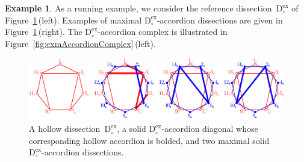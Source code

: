 \documentclass{amsart}
\theoremstyle{definition}
\newtheorem{example}[theorem]{Example}
\newcommand{\fref}[1]{Figure~\ref{#1}} %
\newcommand{\dissection}{\mathrm{D}} %
\newcommand{\ex}{\mathrm{ex}} %
\begin{document}
\begin{example}
As a running example, we consider the reference dissection~$\dissection_\circ^\ex$ of \fref{fig:exmAccordionDissections}\,(left). Examples of maximal $\dissection_\circ^\ex$-accordion dissections are given in \fref{fig:exmAccordionDissections}\,(right). The $\dissection_\circ^\ex$-accordion complex is illustrated in \fref{fig:exmAccordionComplex}\,(left).

\begin{figure}
	\capstart
	\centerline{\includegraphics[scale=.8]{exmAccordionDissections}}
	\vspace*{-.1cm}
	\caption{A hollow dissection~$\dissection_\circ^\ex$, a solid $\dissection_\circ^\ex$-accordion diagonal whose corresponding hollow accordion is bolded, and two maximal solid $\dissection_\circ^\ex$-accordion dissections.}
	\label{fig:exmAccordionDissections}
	\vspace*{-.1cm}
\end{figure}


\end{example}
\end{document}
